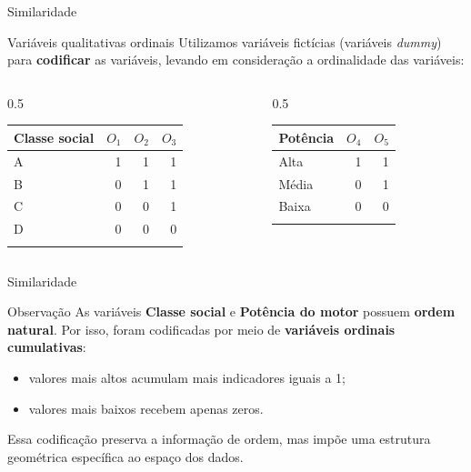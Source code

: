 \documentclass[
  ignorenonframetext,
  aspectratio=169,
]{beamer}
\providecommand{\tightlist}{%
  \setlength{\itemsep}{0pt}\setlength{\parskip}{0pt}}
\begin{document}
\begin{frame}{Similaridade}
\label{similaridade-3}
\begin{block}{Variáveis qualitativas ordinais}
\label{variuxe1veis-qualitativas-ordinais}
Utilizamos variáveis fictícias (variáveis \emph{dummy}) para
\textbf{codificar} as variáveis, levando em consideração a ordinalidade
das variáveis:

\begin{columns}[T]
\begin{column}{0.5\linewidth}
\begin{longtable}[]{@{}lrrr@{}}
\toprule\noalign{}
Classe social & \(O_1\) & \(O_2\) & \(O_3\) \\
\midrule\noalign{}
\endhead
A & 1 & 1 & 1 \\
B & 0 & 1 & 1 \\
C & 0 & 0 & 1 \\
D & 0 & 0 & 0 \\
\bottomrule\noalign{}
\end{longtable}
\end{column}

\begin{column}{0.5\linewidth}
\begin{longtable}[]{@{}lrr@{}}
\toprule\noalign{}
Potência & \(O_4\) & \(O_5\) \\
\midrule\noalign{}
\endhead
Alta & 1 & 1 \\
Média & 0 & 1 \\
Baixa & 0 & 0 \\
\bottomrule\noalign{}
\end{longtable}
\end{column}
\end{columns}
\end{block}
\end{frame}

\begin{frame}{Similaridade}
\label{similaridade-4}
\begin{block}{Observação}
\label{observauxe7uxe3o}
As variáveis \textbf{Classe social} e \textbf{Potência do motor} possuem
\textbf{ordem natural}. Por isso, foram codificadas por meio de
\textbf{variáveis ordinais cumulativas}:

\begin{itemize}
\tightlist
\item
  valores mais altos acumulam mais indicadores iguais a 1;
\item
  valores mais baixos recebem apenas zeros.
\end{itemize}

Essa codificação preserva a informação de ordem, mas impõe uma estrutura
geométrica específica ao espaço dos dados.
\end{block}
\end{frame}
\end{document}
